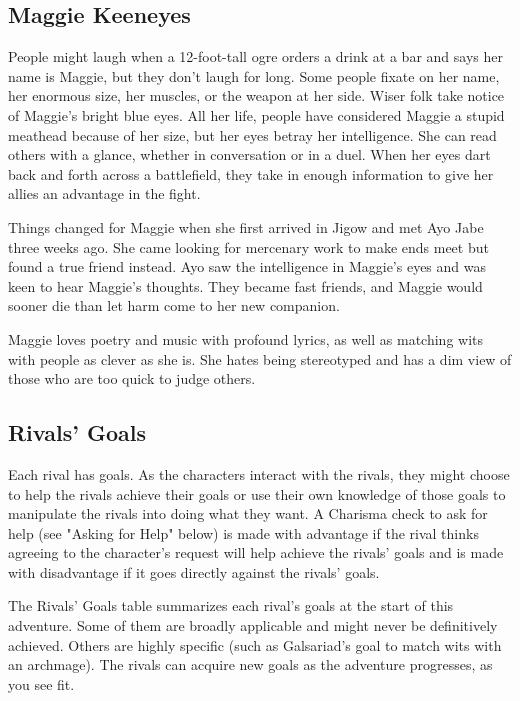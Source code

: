 \documentclass[a4paper, 11pt, bg=full, twocolumn, nooutline]{dndbook}
\begin{document}
\subsection{Maggie Keeneyes}


People might laugh when a 12-foot-tall ogre orders a drink at a bar and says her name is Maggie, but they don't laugh for long. Some people fixate on her name, her enormous size, her muscles, or the weapon at her side. Wiser folk take notice of Maggie's bright blue eyes. All her life, people have considered Maggie a stupid meathead because of her size, but her eyes betray her intelligence. She can read others with a glance, whether in conversation or in a duel. When her eyes dart back and forth across a battlefield, they take in enough information to give her allies an advantage in the fight.

Things changed for Maggie when she first arrived in Jigow and met Ayo Jabe three weeks ago. She came looking for mercenary work to make ends meet but found a true friend instead. Ayo saw the intelligence in Maggie's eyes and was keen to hear Maggie's thoughts. They became fast friends, and Maggie would sooner die than let harm come to her new companion.

Maggie loves poetry and music with profound lyrics, as well as matching wits with people as clever as she is. She hates being stereotyped and has a dim view of those who are too quick to judge others.

\subsection{Rivals' Goals}

Each rival has goals. As the characters interact with the rivals, they might choose to help the rivals achieve their goals or use their own knowledge of those goals to manipulate the rivals into doing what they want. A Charisma check to ask for help (see "Asking for Help" below) is made with advantage if the rival thinks agreeing to the character's request will help achieve the rivals' goals and is made with disadvantage if it goes directly against the rivals' goals.

The Rivals' Goals table summarizes each rival's goals at the start of this adventure. Some of them are broadly applicable and might never be definitively achieved. Others are highly specific (such as Galsariad's goal to match wits with an archmage). The rivals can acquire new goals as the adventure progresses, as you see fit.
\end{document}
